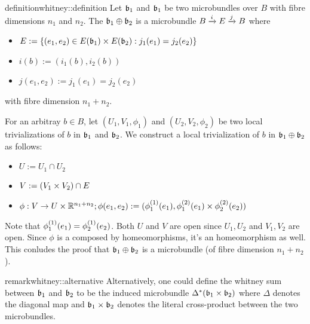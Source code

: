 \begin{mystatement}{definition}{whitney::definition}
    Let $\bb_1$ and $\bb_1$ be two microbundles over $B$ with fibre dimensions $n_1$ and $n_2$.
    The  $\whitney{\bb_1}{\bb_2}$ is a microbundle $\bundle{B}{E}{i}{j}$ where
    \begin{itemize}
        \item $E := \set{ (e_1, e_2) \in E(\bb_1) \cross E(\bb_2)}{j_1(e_1) = j_2(e_2)}$
        \item $i(b) := (i_1(b), i_2(b))$
        \item $j(e_1, e_2) := j_1(e_1) = j_2(e_2)$
    \end{itemize}
    with fibre dimension $n_1 + n_2$.
\end{mystatement}

\begin{myproof}
    For an arbitray $b \in B$, let $(U_1, V_1, \phi_1)$ and $(U_2, V_2, \phi_2)$
    be two local trivializations of $b$ in $\bb_1$ and $\bb_2$.
    We construct a local trivialization of $b$ in $\whitney{\bb_1}{\bb_2}$ as follows:
    \begin{itemize}
        \item $U := U_1 \cap U_2$
        \item $V := (V_1 \cross V_2) \cap E$
        \item $\phi: V \to U \cross \R^{n_1 + n_2}; \phi(e_1, e_2) := (\frst{\phi_1}(e_1), \snd{\phi_1}(e_1) \cross  \snd{\phi_2}(e_2))$
    \end{itemize}
    Note that $\frst{\phi_1}(e_1) = \frst{\phi_2}(e_2)$.
    Both $U$ and $V$ are open since $U_1, U_2$ and $V_1, V_2$ are open.
    Since $\phi$ is a composed by homeomorphisms, it's an homeomorphism as well.
    This conludes the proof that $\whitney{\bb_1}{\bb_2}$ is a microbundle (of fibre dimension $n_1 + n_2$).
\end{myproof}

\begin{mystatement}{remark}{whitney::alternative}
    Alternatively, one could define the whitney sum between $\bb_1$ and $\bb_2$
    to be the induced microbundle $\ind{\Delta}(\bb_1 \cross \bb_2)$
    where $\Delta$ denotes the diagonal map and $\bb_1 \cross \bb_2$
    denotes the literal cross-product between the two microbundles.
\end{mystatement}